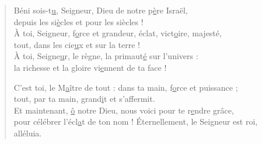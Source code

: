 \begin{verse}
Béni sois-t\underline{u}, Seigneur, \psalmdagger
Dieu de notre p\underline{è}re Israël,\\
depuis les si\underline{è}cles et pour les siècles !\\

À toi, Seigneur, f\underline{o}rce et grandeur, \psalmdagger
éclat, vict\underline{o}ire, majesté,\\
tout, dans les cie\underline{u}x et sur la terre !\\

À toi, Seigne\underline{u}r, le règne, \psalmdagger
la primaut\underline{é} sur l'univers :\\
la richesse et la gloire vi\underline{e}nnent de ta face !\psalmstar

C'est toi, le M\underline{a}ître de tout : \psalmdagger
dans ta main, f\underline{o}rce et puissance ;\\
tout, par ta main, grand\underline{i}t et s'affermit.\\

Et maintenant, \underline{ô} notre Dieu, \psalmdagger
nous voici pour te r\underline{e}ndre grâce,\\
pour célébrer l'écl\underline{a}t de ton nom !
Éternellement, le Seigneur est roi, alléluia.
\end{verse}


